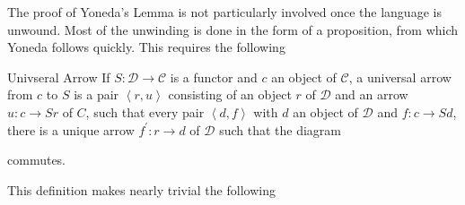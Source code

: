 \documentclass[10pt]{amsart}
\begin{document}
The proof of Yoneda's Lemma is not particularly involved once the language is unwound.  Most of the unwinding is done in the form of a proposition, from which Yoneda follows quickly.  This requires the following
\begin{defn}{Univseral Arrow}
  If $S: \mathcal{D} \rightarrow \mathcal{C}$ is a functor and $c$ an object of $\mathcal{C}$, a universal arrow from $c$ to $S$ is a pair $\left<r, u\right>$ consisting of an object $r$ of $\mathcal{D}$ and an arrow $u \colon c \rightarrow Sr$ of $C$, such that every pair $\left<d,f\right>$ with $d$ an object of $\mathcal{D}$ and $f \colon c \rightarrow Sd$, there is a unique arrow $f^\prime \colon r \rightarrow d$ of $\mathcal{D}$ such that the diagram
  \begin{center}
  \end{center}
  commutes.
\end{defn}
This definition makes nearly trivial the following
\end{document}
